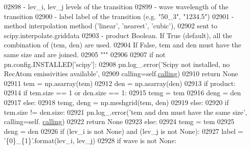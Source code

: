 \begin{DoxyCode}
{{{{{{{{{{{{{{{{{{{{{{02898 \textcolor{stringliteral}{            - lev\_i, lev\_j   levels of the transition}
02899 \textcolor{stringliteral}{            - wave           wavelength of the transition}
02900 \textcolor{stringliteral}{            - label          label of the transition (e.g. "50\_3", "1234.5")}
02901 \textcolor{stringliteral}{            - method         interpolation method ('linear', 'nearest', 'cubic'), }
02902 \textcolor{stringliteral}{                             sent to scipy.interpolate.griddata    }
02903 \textcolor{stringliteral}{            - product        Boolean. If True (default), all the combination of (tem, den) are used. }
02904 \textcolor{stringliteral}{                             If False, tem and den must have the same size and are joined.}
02905 \textcolor{stringliteral}{        """}
02906         
02907         \textcolor{keywordflow}{if} \textcolor{keywordflow}{not} pn.config.INSTALLED[\textcolor{stringliteral}{'scipy'}]:
02908             pn.log\_.error(\textcolor{stringliteral}{'Scipy not installed, no RecAtom emissivities available'},
02909                           calling=self.\hyperlink{classpyneb_1_1core_1_1pynebcore_1_1_rec_atom_a82ec425ebba32b73a5d9ae52717d47c4}{calling})
02910             \textcolor{keywordflow}{return} \textcolor{keywordtype}{None}
02911         tem = np.asarray(tem)
02912         den = np.asarray(den)
02913         \textcolor{keywordflow}{if} product:
02914             \textcolor{keywordflow}{if} tem.size == 1 \textcolor{keywordflow}{or} den.size == 1:
02915                 temg = tem
02916                 deng = den
02917             \textcolor{keywordflow}{else}:
02918                 temg, deng = np.meshgrid(tem, den)
02919         \textcolor{keywordflow}{else}:
02920             \textcolor{keywordflow}{if} tem.size != den.size:
02921                 pn.log\_.error(\textcolor{stringliteral}{'tem and den must have the same size'}, calling=self.
      \hyperlink{classpyneb_1_1core_1_1pynebcore_1_1_rec_atom_a82ec425ebba32b73a5d9ae52717d47c4}{calling})
02922                 \textcolor{keywordflow}{return} \textcolor{keywordtype}{None}
02923             \textcolor{keywordflow}{else}:
02924                 temg = tem
02925                 deng = den
02926         \textcolor{keywordflow}{if} (lev\_i \textcolor{keywordflow}{is} \textcolor{keywordflow}{not} \textcolor{keywordtype}{None}) \textcolor{keywordflow}{and} (lev\_j \textcolor{keywordflow}{is} \textcolor{keywordflow}{not} \textcolor{keywordtype}{None}):
02927             label = \textcolor{stringliteral}{'\{0\}\_\{1\}'}.format(lev\_i, lev\_j)
02928         \textcolor{keywordflow}{if} wave \textcolor{keywordflow}{is} \textcolor{keywordflow}{not} \textcolor{keywordtype}{None}:
}}}}}}}}}}}}}}}}}}}}}}
\end{DoxyCode}
